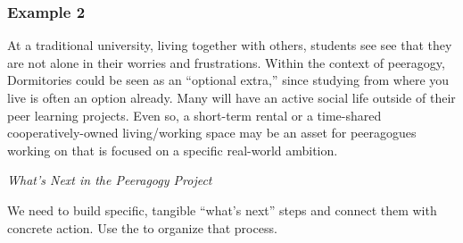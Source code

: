 \subsubsection*{Example 2}
At a traditional university,  living together with others, students see see that they are not alone in their worries and frustrations.  Within the context of peeragogy, Dormitories could be seen as an ``optional extra,'' since studying
from where you live is often an option already.  Many will have an active social life outside of their peer learning projects.  Even so, a short-term rental or a time-shared cooperatively-owned living/working space may be an asset for peeragogues working on  that is focused on a specific real-world ambition.


\begin{framed}
\noindent 
\emph{What's Next in the Peeragogy Project}
\begin{collectinmacro}{\SpecificWN}{}{}
We need to build specific, tangible ``what's next'' steps and connect them with concrete action. Use the  to organize that process. 
\end{collectinmacro}
\SpecificWN
\end{framed}

